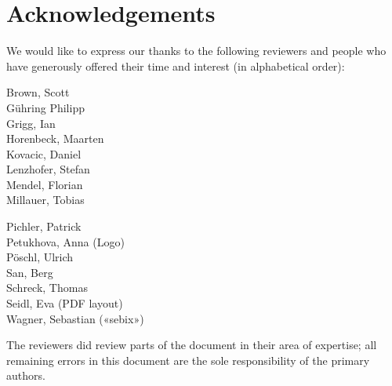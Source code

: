 \newpage
\section*{Acknowledgements}
\label{section:Reviewers}


We would like to express our thanks to the following reviewers and people who have generously offered their time and interest (in alphabetical order):


\vline{}

\begin{minipage}[b]{0.5\linewidth}
\center
Brown, Scott \\
Gühring Philipp  \\
Grigg, Ian  \\
Horenbeck, Maarten \\
Kovacic, Daniel \\
Lenzhofer, Stefan \\
Mendel, Florian \\
Millauer, Tobias \\
\end{minipage}
\begin{minipage}[b]{0.5\linewidth}
\center
Pichler, Patrick \\
Petukhova, Anna (Logo) \\
Pöschl, Ulrich \\
San, Berg \\
Schreck, Thomas  \\
Seidl, Eva (PDF layout) \\
Wagner, Sebastian («sebix») \\
\end{minipage}

\vline{}

The reviewers did review parts of the document in their area of
expertise; all remaining errors in this document are the sole
responsibility of the primary authors.



